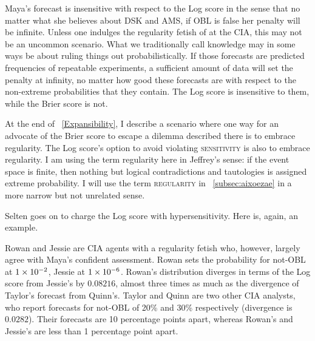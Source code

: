 \documentclass[12pt]{article}
\begin{document}
Maya's forecast is insensitive with respect to the Log score in the
sense that no matter what she believes about DSK and AMS, if OBL is
false her penalty will be infinite. Unless one indulges the regularity
fetish of  at the CIA, this may not be an uncommon
scenario. What we traditionally call knowledge may in some ways be
about ruling things out probabilistically. If those forecasts are
predicted frequencies of repeatable experiments, a sufficient amount
of data will set the penalty at infinity, no matter how good these
forecasts are with respect to the non-extreme probabilities that they
contain. The Log score is insensitive to them, while the Brier score
is not.

At the end of {\ubsection}~\ref{Expansibility}, I describe a scenario
where one way for an advocate of the Brier score to escape a dilemma
described there is to embrace regularity. The Log score's option to
avoid violating \textsc{sensitivity} is also to embrace regularity. I
am using the term regularity here in Jeffrey's sense: if the event
space is finite, then nothing but logical contradictions and
tautologies is assigned extreme probability. I will use the term
\textsc{regularity} in {\ubsection}~\ref{subsec:aixoezae} in a more
narrow but not unrelated sense.

Selten goes on to charge the Log score with hypersensitivity. Here is,
again, an example.

\begin{example}
  \label{ex:theameiy} 
  Rowan and Jessie are CIA agents with a regularity fetish who,
  however, largely agree with Maya's confident assessment. Rowan sets
  the probability for not-OBL at $1\times 10^{-2}$, Jessie at $1\times 10^{-6}$.
  Rowan's distribution diverges in terms of the Log score from
  Jessie's by $0.08216$, almost three times as much as the divergence
  of Taylor's forecast from Quinn's. Taylor and Quinn are two other
  CIA analysts, who report forecasts for not-OBL of 20\% and 30\%
  respectively (divergence is $0.0282$). Their forecasts are 10
  percentage points apart, whereas Rowan's and Jessie's are less than
  1 percentage point apart.
\end{example}
\end{document}
